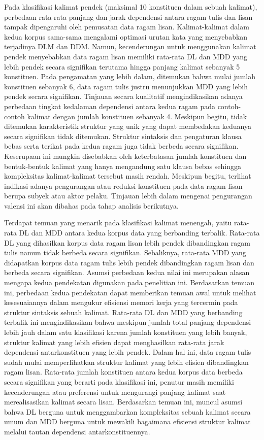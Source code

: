 Pada klasifikasi kalimat pendek (maksimal 10 konstituen dalam sebuah kalimat), perbedaan rata-rata panjang dan jarak dependensi antara ragam tulis dan lisan tampak dipengaruhi oleh pemusatan data ragam lisan. Kalimat-kalimat dalam kedua korpus sama-sama mengalami optimasi urutan kata yang menyebabkan terjadinya DLM dan DDM.  Namun, kecenderungan untuk menggunakan kalimat pendek menyebabkan data ragam lisan memiliki rata-rata DL dan MDD yang lebih pendek secara signifikan terutama hingga panjang kalimat sebanyak 5 konstituen. Pada pengamatan yang lebih dalam, ditemukan bahwa mulai jumlah konstituen sebanyak 6, data ragam tulis justru menunjukkan MDD yang lebih pendek secara signifikan. Tinjauan secara kualitatif mengindikasikan adanya perbedaan tingkat kedalaman dependensi antara kedua ragam pada contoh-contoh kalimat dengan jumlah konstituen sebanyak 4. Meskipun begitu, tidak ditemukan karakteristik struktur yang unik yang dapat membedakan keduanya secara signifikan tidak ditemukan. Struktur sintaksis dan pengaturan klausa bebas serta terikat pada kedua ragam juga tidak berbeda secara signifikan. Keserupaan ini mungkin disebabkan oleh keterbatasan jumlah konstituen dan bentuk-bentuk kalimat yang hanya mengandung satu klausa bebas sehingga kompleksitas kalimat-kalimat tersebut masih rendah. Meskipun begitu, terlihat indikasi adanya pengurangan atau reduksi konstituen pada data ragam lisan berupa subyek atau aktor pelaku. Tinjauan lebih dalam mengenai pengurangan valensi ini akan dibahas pada tahap analisis berikutnya.

Terdapat temuan yang menarik pada klasifikasi kalimat menengah, yaitu rata-rata DL dan MDD antara kedua korpus data yang berbanding terbalik. Rata-rata DL yang dihasilkan korpus data ragam lisan lebih pendek dibandingkan ragam tulis namun tidak berbeda secara signifikan. Sebaliknya, rata-rata MDD yang didapatkan korpus data ragam tulis lebih pendek dibandingkan ragam lisan dan berbeda secara signifikan. Asumsi perbedaan kedua nilai ini merupakan alasan mengapa kedua pendekatan digunakan pada penelitian ini. Berdasarkan temuan ini, perbedaan kedua pendekatan dapat memberikan temuan awal untuk melihat kesesuaiannya dalam mengukur efisiensi memori kerja yang tercermin pada struktur sintaksis sebuah kalimat. Rata-rata DL dan MDD yang berbanding terbalik ini mengindikasikan bahwa meskipun jumlah total panjang dependensi lebih jauh dalam satu klasifikasi karena jumlah konstituen yang lebih banyak, struktur kalimat yang lebih efisien dapat menghasilkan rata-rata jarak dependensi antarkonstituen yang lebih pendek. Dalam hal ini, data ragam tulis sudah mulai memperlihatkan struktur kalimat yang lebih efisien dibandingkan ragam lisan. Rata-rata jumlah konstituen antara kedua korpus data berbeda secara signifikan yang berarti pada klasifikasi ini, penutur masih memiliki kecenderungan atau preferensi untuk mengurangi panjang kalimat saat merealisasikan kalimat secara lisan. Berdasarkan temuan ini, muncul asumsi bahwa DL berguna untuk menggambarkan kompleksitas sebuah kalimat secara umum dan MDD berguna untuk mewakili bagaimana efisiensi struktur kalimat melalui tautan dependensi antarkonstituennya.

